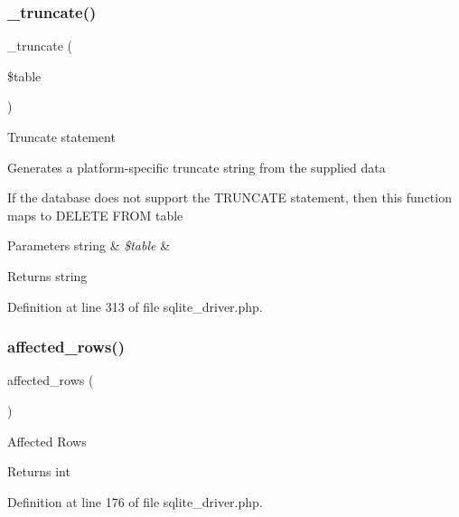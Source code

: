 \subsubsection{\texorpdfstring{\_truncate()}{\_truncate()}}
{\footnotesize\ttfamily \+\_\+truncate (\begin{DoxyParamCaption}\item[{}]{\$table }\end{DoxyParamCaption})\hspace{0.3cm}{\ttfamily [protected]}}

Truncate statement

Generates a platform-\/specific truncate string from the supplied data

If the database does not support the T\+R\+U\+N\+C\+A\+TE statement, then this function maps to \textquotesingle{}D\+E\+L\+E\+TE F\+R\+OM table\textquotesingle{}


\begin{DoxyParams}[1]{Parameters}
string & {\em \$table} & \\
\hline
\end{DoxyParams}
\begin{DoxyReturn}{Returns}
string 
\end{DoxyReturn}


Definition at line 313 of file sqlite\+\_\+driver.\+php.

\mbox{\label{class_c_i___d_b__sqlite__driver_a77248aaad33eb132c04cc4aa3f4bc8cb}} 
\subsubsection{\texorpdfstring{affected\_rows()}{affected\_rows()}}
{\footnotesize\ttfamily affected\+\_\+rows (\begin{DoxyParamCaption}{ }\end{DoxyParamCaption})}

Affected Rows

\begin{DoxyReturn}{Returns}
int 
\end{DoxyReturn}


Definition at line 176 of file sqlite\+\_\+driver.\+php.

\mbox{\label{class_c_i___d_b__sqlite__driver_a52bf595e79e96cc0a7c907a9b45aeb4d}} 
